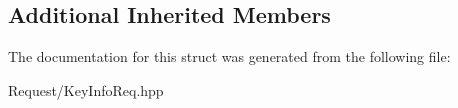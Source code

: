 \subsection*{Additional Inherited Members}


The documentation for this struct was generated from the following file\+:\begin{DoxyCompactItemize}
\item 
Request/Key\+Info\+Req.\+hpp\end{DoxyCompactItemize}
